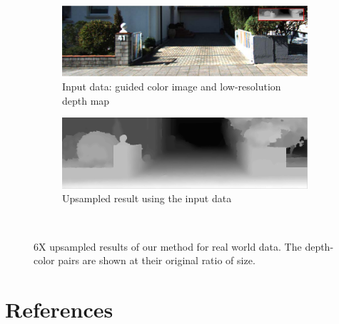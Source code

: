 \documentclass[preprint,10pt,5p,times,twocolumn]{elsarticle}
\begin{document}
\begin{figure}[t]
\begin{subfigure}[b]{0.49\textwidth}
\includegraphics[width=\textwidth]{exp2_ref_gray.pdf}
\caption*{Input data: guided color image and low-resolution depth map}
\end{subfigure}
\begin{subfigure}[b]{0.49\textwidth}
\includegraphics[width=\textwidth]{exp2_upsampling_smooth.png}
\caption*{Upsampled result using the input data}
\end{subfigure}
\\
\caption{6X upsampled results of our method for real world data. The depth-color pairs are shown at their original ratio of size.}
\label{fig:upsampling}
\end{figure}







\section*{References}



\end{document}
